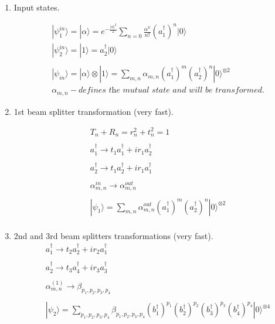 \documentclass[12pt]{article}
\begin{document}
\maketitle


\begin{enumerate}

\item Input states.

\begin{align*}
& |\psi_{1}^{in}\rangle = |\alpha\rangle  = e^{-\frac{|\alpha|^2}{2}}  \sum_{n=0} \frac{\alpha^{n}}{n!}(a_{1}^{\dag})^{n} |0\rangle  \\ 
& |\psi_{2}^{in}\rangle = |1\rangle = a_{2}^{\dag} |0\rangle  \\
\\
& |\psi_{in}\rangle = |\alpha\rangle    \otimes   |1\rangle  = \sum_{m,n} \alpha_{m,n} (a_{1}^{\dag})^{m} (a_{2}^{\dag})^{n} |0\rangle^{\otimes 2}  \\
& \alpha_{m,n} - \textit{defines the mutual state and will be transformed}.
\end{align*}

\item 1st beam splitter transformation (very fast).

\begin{align*}
&  T_{n} +  R_{n} = r_{n}^2 + t_{n}^2 = 1 \\
\\
&  a_{1}^{\dag} \rightarrow  t_{1}a_{1}^{\dag} + ir_{1}a_{2}^{\dag} \\
\\
&  a_{2}^{\dag} \rightarrow  t_{1}a_{2}^{\dag} + ir_{1}a_{1}^{\dag} \\
\\
& \alpha_{m,n}^{in} \rightarrow \alpha_{m,n}^{out} \\
\\
& |\psi_{1}\rangle = \sum_{m,n} \alpha_{m,n}^{out} (a_{1}^{\dag})^{m} (a_{2}^{\dag})^{n} |0\rangle^{\otimes 2} \\
\end{align*}

\item 2nd and 3rd beam splitters transformations (very fast).
\begin{align*}
&  a_{1}^{\dag} \rightarrow  t_{2}a_{2}^{\dag} + ir_{2}a_{1}^{\dag} \\
\\
&  a_{2}^{\dag} \rightarrow  t_{3}a_{4}^{\dag} + ir_{3}a_{3}^{\dag} \\
\\
& \alpha_{m,n}^{(1)} \rightarrow \beta_{p_{1},p_{2},p_{3},p_{4}} \\
\\
& |\psi_2\rangle = \sum_{p_{1},p_{2},p_{3},p_{4}} \beta_{p_{1},p_{2},p_{3},p_{4}} (b_{1}^{\dag})^{p_{1}}  (b_{2}^{\dag})^{p_{2}} (b_{3}^{\dag})^{p_{3}}  (b_{4}^{\dag})^{p_{4}} |0\rangle^{\otimes 4} 
\end{align*}


\end{enumerate}
\end{document}
